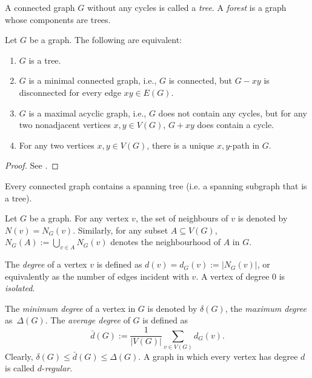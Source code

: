 \begin{definition}
    A connected graph $G$ without any cycles is called a \textit{tree}. 
    A \textit{forest} is a graph whose components are trees.
\end{definition}

\begin{proposition}
        Let $G$ be a graph. The following are equivalent: 
    \begin{enumerate}
        \item $G$ is a tree.
        \item $G$ is a minimal connected graph, i.e., $G$ is connected, but $G - xy$ is disconnected for every edge $xy \in E(G)$. 
        \item $G$ is a maximal acyclic graph, i.e., $G$ does not contain any cycles, but for any two nonadjacent vertices $x, y \in V(G)$, $G + xy$ does contain a cycle.
        \item For any two vertices $x, y \in V(G)$, there is a unique $x, y$-path in $G$.
    \end{enumerate}
\end{proposition}

\begin{proof}
    See \cite[Theorems I.5 and I.6]{bollobas}.
\end{proof}

\begin{corollary}
    Every connected graph contains a spanning tree (i.e. a spanning subgraph that is a tree).
\end{corollary}


\begin{definition}
    Let $G$ be a graph. 
    For any vertex $v$, the set of neighbours of $v$ is denoted by $N(v) = N_G(v)$.
    Similarly, for any subset $A \subseteq V(G)$, $N_G(A) := \bigcup_{v \in A} N_G(v)$ denotes the neighbourhood of $A$ in $G$.
        
    The \textit{degree} of a vertex $v$ is defined as \mbox{$d(v) = d_G(v) := |N_G(v)|$}, or equivalently as the number of edges incident with $v$.
    A vertex of degree $0$ is \textit{isolated}.

    The \textit{minimum degree} of a vertex in $G$ is denoted by $\delta(G)$,
    the \textit{maximum degree} \mbox{as $\Delta(G)$}.
    The \textit{average degree} of $G$ is defined as 
    \begin{equation*}
        \bar{d} (G) := \frac{1}{|V(G)|} \sum \limits_{v \in V(G)} d_G (v).
    \end{equation*}
    Clearly, $\delta (G) \le \bar{d} (G) \le \Delta (G)$. 
    A graph in which every vertex has degree $d$ is called $d$-\textit{regular}.    
\end{definition}

